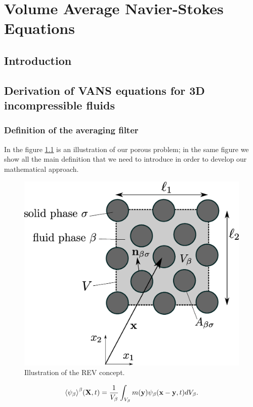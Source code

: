 \chapter{Volume Average Navier-Stokes Equations}

\section{Introduction}


\section{Derivation of VANS equations for 3D incompressible fluids}
\subsection{Definition of the averaging filter}

In the figure \ref{fig:rev} is an illustration of our porous problem; in the same figure we show all the main definition that we need to introduce in order to develop our mathematical approach.


\begin{figure}[H]
	\centering
	\includegraphics[width=0.8\linewidth]{chapter_4/figure/REV}
	\caption{Illustration of the REV concept.}
	\label{fig:rev}
\end{figure}


\begin{equation}
{\left< \psi_{\beta} \right>}^{\beta}(\mathbf{X}, t) = \dfrac{1}{V_\beta} \int_{V_\beta} m(\mathbf{y}) \psi_{\beta}(\mathbf{x}-\mathbf{y}, t) d V_\beta.
\label{eq:avg_intrinsic}
\end{equation}


